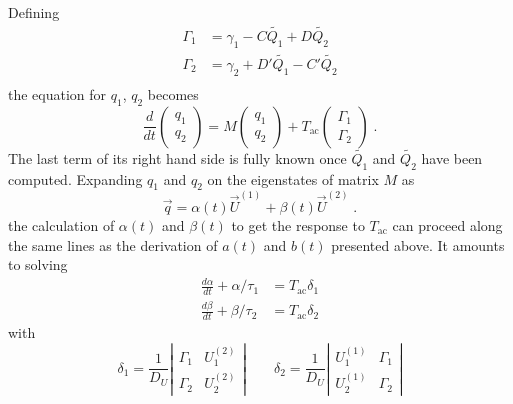 \documentclass[pre,a4paper,twocolumn,superscriptaddress,%
floatfix]{revtex4}
\newcommand{\tac}{\ensuremath{T_{\mathrm{ac}}}}
\begin{document}
Defining
\begin{align}
  \label{eq:Gamma}
  \Gamma_1 &= \gamma_1 - C \widetilde{Q_1} + D \widetilde{Q_2}
             \nonumber \\
  \Gamma_2 &= \gamma_2 + D' \widetilde{Q_1} - C' \widetilde{Q_2}
             \nonumber \\
\end{align}
the equation for $q_1$, $q_2$ becomes
\begin{equation}
  \label{eq:smallqmatrix}
  \frac{d}{dt} \left( \begin{array}{c}q_1 \\ q_2 \end{array} \right)
  = M  \left( \begin{array}{c}q_1 \\ q_2 \end{array} \right) +
  \tac \left( \begin{array}{c}\Gamma_1 \\ \Gamma_2 \end{array} \right) \; .
\end{equation}
The last term of its right hand side is fully known once $\widetilde{Q_1}$
and $\widetilde{Q_2}$ have been computed. Expanding $q_1$ and $q_2$
on the eigenstates of matrix $M$ as
\begin{equation}
    \label{eq:decompos-smallq}
    \vec{q} = \alpha(t) \vec{U}^{(1)} + \beta(t) \vec{U}^{(2)} \; .
\end{equation}
the calculation of $\alpha(t)$ and $\beta(t)$ to get the
response to $\tac$ can proceed along the same lines as the derivation of
$a(t)$ and $b(t)$ presented above. It amounts to solving
\begin{align}
  \label{eq:alpha}
  \frac{d \alpha}{dt} + \alpha/\tau_1 &= \tac \delta_1 \\
  \label{eq:beta}
   \frac{d \beta}{dt} + \beta/\tau_2 &= \tac \delta_2 
\end{align}
with
\begin{equation}
  \label{eq:delta12}
  \delta_1 = \frac{1}{D_U} \left|
    \begin{array}{cc} \Gamma_1 & U_1^{(2)} \\ \Gamma_2 & U_2^{(2)}
    \end{array} \right|
  \qquad \delta_2 = \frac{1}{D_U} \left|
    \begin{array}{cc} U_1^{(1)} & \Gamma_1 \\ U_2^{(1)} & \Gamma_2
        \end{array} \right| 
\end{equation}
\end{document}
